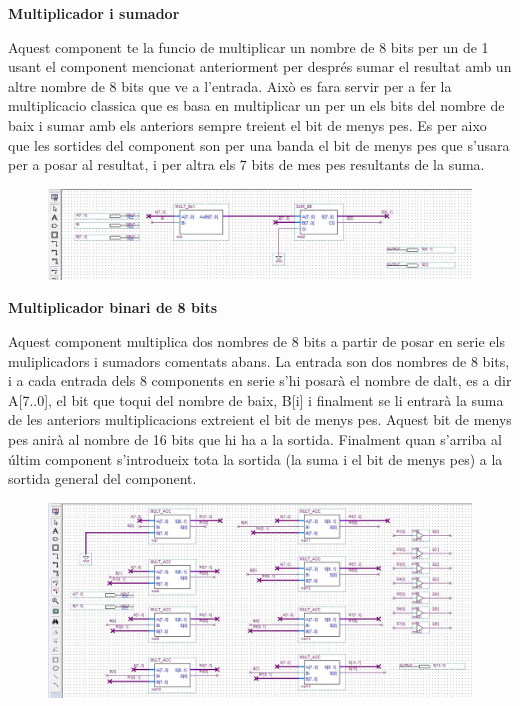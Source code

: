 \documentclass[12pt, a4papre]{article}
\begin{document}
	\textbf{\large{Multiplicador i sumador}}
	
	Aquest component te la funcio de multiplicar un nombre de 8 bits per un de 1 usant el component mencionat anteriorment per després sumar el resultat amb un altre nombre de 8 bits que ve a l'entrada. Això es fara servir per a fer la multiplicacio classica que es basa en multiplicar un per un els bits del nombre de baix i sumar amb els anteriors sempre treient el bit de menys pes. Es per aixo que les sortides del component son per una banda el bit de menys pes que s'usara per a posar al resultat, i per altra els 7 bits de mes pes resultants de la suma. 
	
	\begin{center}
	\begin{figure}[H]
		\begin{center}
		\includegraphics[width=150mm]{MULT_+SUM.jpeg}
		\end{center}
	\end{figure}
	
	\end{center}
	
	
	\textbf{\large{Multiplicador binari de 8 bits}}
	
	Aquest component multiplica dos nombres de 8 bits a partir de posar en serie els muliplicadors i sumadors comentats abans. La entrada son dos nombres de 8 bits, i a cada entrada dels 8 components en serie s'hi posarà el nombre de dalt, es a dir A[7..0], el bit que toqui del nombre de baix, B[i] i finalment se li entrarà la suma de les anteriors multiplicacions extreient el bit de menys pes. Aquest bit de menys pes anirà al nombre de 16 bits que hi ha a la sortida. Finalment quan s'arriba al últim component s'introdueix tota la sortida (la suma i el bit de menys pes) a la sortida general del component.
	
	\begin{center}
	\begin{figure}[H]
		\begin{center}
		\includegraphics[width=150mm]{multbin8bits.jpeg}
		\end{center}
	\end{figure}
	
	\end{center}
	
\end{document}
